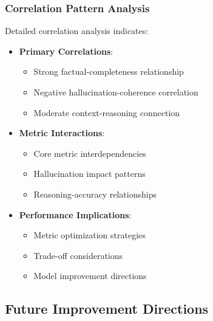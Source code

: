 \subsubsection{Correlation Pattern Analysis}
Detailed correlation analysis indicates:
\begin{itemize}
    \item \textbf{Primary Correlations}:
    \begin{itemize}
        \item Strong factual-completeness relationship
        \item Negative hallucination-coherence correlation
        \item Moderate context-reasoning connection
    \end{itemize}
    \item \textbf{Metric Interactions}:
    \begin{itemize}
        \item Core metric interdependencies
        \item Hallucination impact patterns
        \item Reasoning-accuracy relationships
    \end{itemize}
    \item \textbf{Performance Implications}:
    \begin{itemize}
        \item Metric optimization strategies
        \item Trade-off considerations
        \item Model improvement directions
    \end{itemize}
\end{itemize}

\subsection{Future Improvement Directions}

